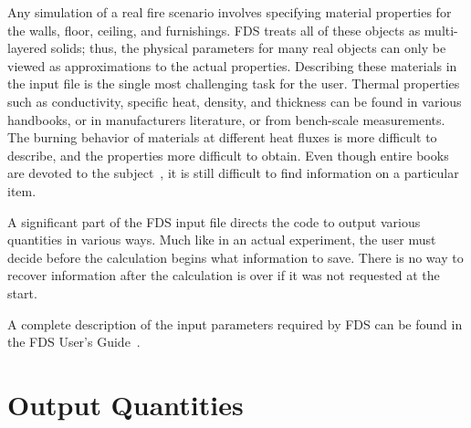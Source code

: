 \documentclass[11pt]{book}
\begin{document}
Any simulation of a real fire scenario involves specifying material properties for the walls, floor, ceiling, and furnishings. FDS treats all of
these objects as multi-layered solids; thus, the physical parameters for many real objects can only be viewed as approximations to the actual
properties. Describing these materials in the input file is the single most challenging task for the user. Thermal properties such as conductivity,
specific heat, density, and thickness can be found in various handbooks, or in manufacturers literature, or from bench-scale measurements. The
burning behavior of materials at different heat fluxes is more difficult to describe, and the properties more difficult to obtain. Even though entire
books are devoted to the subject~\cite{Babrauskas:2}, it is still difficult to find information on a particular item.

A significant part of the FDS input file directs the code to output various quantities in various ways. Much like in an actual experiment, the user
must decide before the calculation begins what information to save. There is no way to recover information after the calculation is over if it was
not requested at the start.

A complete description of the input parameters required by FDS can be found in the FDS User's Guide~\cite{FDS_Users_Guide}.


\section{Output Quantities}
\end{document}
